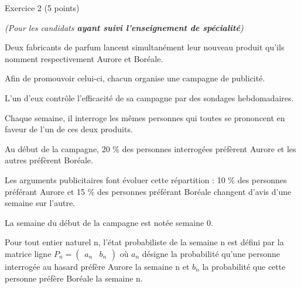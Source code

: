 
%
\begin{h2}Exercice 2 (5 points)\end{h2}
\textit{(Pour les candidats \textbf{ayant suivi l'enseignement de spécialité})}
\par
Deux fabricants de parfum lancent simultanément leur nouveau produit qu'ils nomment respectivement Aurore et Boréale.
\par
Afin de promouvoir celui-ci, chacun organise une campagne de publicité.
\par
L'un d'eux contrôle l'efficacité de sa campagne par des sondages hebdomadaires.
\par
Chaque semaine, il interroge les mêmes personnes qui toutes se prononcent en faveur de l'un de ces deux produits.
\par
Au début de la campagne, 20 \% des personnes interrogées préfèrent Aurore et les autres préfèrent Boréale.
\par
Les arguments publicitaires font évoluer cette répartition : 10 \% des personnes préférant Aurore et 15 \% des personnes préférant Boréale changent d'avis d'une semaine sur l'autre.
\par
La semaine du début de la campagne est notée semaine 0.
\par
Pour tout entier naturel n, l'état probabiliste de la semaine n est défini par la matrice ligne $P_{n}=\begin{pmatrix}a_{n} & b_{n}\end{pmatrix}$ où $a_{n}$ désigne la probabilité qu'une personne interrogée au hasard préfère Aurore la semaine n et $b_{n}$ la probabilité que cette personne préfère Boréale la semaine n.
